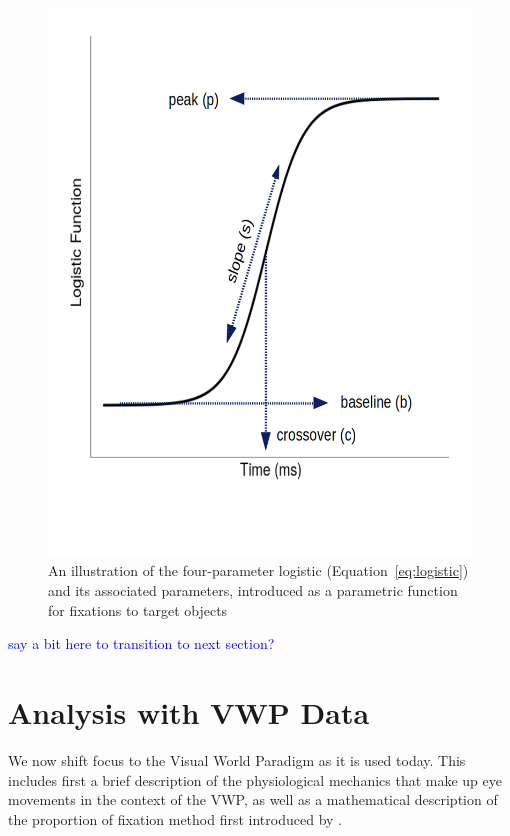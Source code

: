 \documentclass{article}
\providecommand{\cn}[1]{\textcolor{blue}{#1}}
\begin{document}
\begin{figure}[h]
\centering
\includegraphics[scale=0.4]{logistic_label.png}
\caption{An illustration of the four-parameter logistic (Equation~\ref{eq:logistic}) and its associated parameters, introduced as a parametric function for fixations to target objects}
\label{fig:logistic_definition}
\end{figure}

\cn{say a bit here to transition to next section?}


\section{Analysis with VWP Data}

We now shift focus to the Visual World Paradigm as it is used today. This includes first a brief description of the physiological mechanics that make up eye movements in the context of the VWP, as well as a mathematical description of the proportion of fixation method first introduced by \citet{allopenna1998tracking}.  
\end{document}
